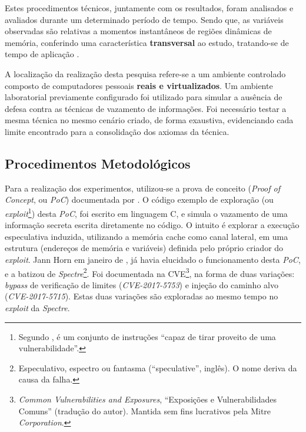 \documentclass[
	article,			    %
	12pt,				    %
	oneside,			    %
	a4paper,			    %
	chapter=TITLE,		    %
	section=TITLE,		    %
	subsection=TITLE,	    %
	english,			    %
	brazil,				    %
	sumario=tradicional
]{abntex2}
\begin{document}
Estes procedimentos técnicos, juntamente com os resultados, foram analisados e avaliados durante um determinado período de tempo. Sendo que, as variáveis observadas são relativas a momentos instantâneos de regiões dinâmicas de memória, conferindo uma característica \textbf{transversal} ao estudo, tratando-se de tempo de aplicação \cite{Mauro2009Metodologia}.

A localização da realização desta pesquisa refere-se a um ambiente controlado composto de computadores pessoais \textbf{reais e virtualizados}. Um ambiente laboratorial previamente configurado foi utilizado para simular a ausência de defesa contra as técnicas de vazamento de informações. Foi necessário testar a mesma técnica no mesmo cenário criado, de forma exaustiva, evidenciando cada limite encontrado para a consolidação dos axiomas da técnica.

\subsection{Procedimentos Metodológicos}
Para a realização dos experimentos, utilizou-se a prova de conceito (\emph{Proof of Concept}, ou \emph{PoC}) documentada por . O código exemplo de exploração (ou \emph{exploit}\footnote{Segundo  , é um conjunto de instruções ``capaz de tirar proveito de uma vulnerabilidade''.}) desta \emph{PoC}, foi escrito em linguagem C, e simula o vazamento de uma informação secreta escrita diretamente no código. O intuito é explorar a execução especulativa induzida, utilizando a memória cache como canal lateral, em uma estrutura (endereços de memória e variáveis) definida pelo próprio criador do \emph{exploit}. Jann Horn em janeiro de \citeyear{googleprojectzero}, já havia elucidado o funcionamento desta \emph{PoC}, e a batizou de \emph{Spectre}\footnote{Especulativo, espectro ou fantasma (``speculative'', inglês). O nome deriva da causa da falha.}. Foi documentada na CVE\footnote{\emph{Common Vulnerabilities and Exposures}, ``Exposições e Vulnerabilidades Comuns'' (tradução do autor). Mantida sem fins lucrativos pela Mitre \emph{Corporation}.}, na forma de duas variações: \emph{bypass} de verificação de limites (\emph{CVE-2017-5753}) e injeção do caminho alvo (\emph{CVE-2017-5715}). Estas duas variações são exploradas ao mesmo tempo no \emph{exploit} da \emph{Spectre}.
\end{document}
